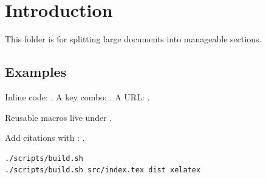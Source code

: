 \section*{Introduction}

This folder is for splitting large documents into manageable sections.

\subsection*{Examples}

Inline code: . A key combo: . A URL: .

\begin{tightitemize}
  \item Reusable macros live under .
  \item Add citations with : \cite{example}.
\end{tightitemize}

\begin{lstlisting}[language=bash,caption={Build locally}]
./scripts/build.sh
./scripts/build.sh src/index.tex dist xelatex
\end{lstlisting}
